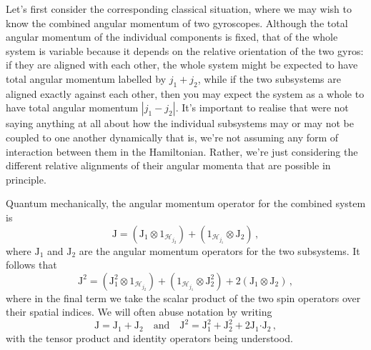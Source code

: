 \documentclass{article}
\theoremstyle{plain}\theoremheaderfont{\normalfont\itshape}\theorembodyfont{\rmfamily}\theoremseparator{.}\newtheorem*{rem}{Remark}\newtheorem*{ex}{Example}\newtheorem*{proof}{Proof}\newtheorem*{altp}{Alternative proof}
\theoremstyle{plain}\theoremheaderfont{\normalfont\bfseries}\theorembodyfont{\rmfamily}\theoremseparator{.}\newtheorem{thm}{Theorem}[section]\newtheorem{lem}[thm]{Lemma}\newtheorem{prop}[thm]{Proposition}\newtheorem*{cor}{Corollary}\newtheorem{defn}[thm]{Definition}\newtheorem{clm}[thm]{Claim}\newtheorem{clminproof}{Claim}
\theoremstyle{break}\theoremheaderfont{\normalfont\itshape}\theorembodyfont{\rmfamily}\theoremseparator{.\medskip}\newtheorem*{proofskip}{Proof}\newtheorem*{exs}{Examples}\newtheorem*{rems}{Remarks}
\theoremstyle{break}\theoremheaderfont{\normalfont\bfseries}\theorembodyfont{\rmfamily}\theoremseparator{.\medskip}\newtheorem{lemskip}[thm]{Lemma}\newtheorem{defnskip}[thm]{Definition}\newtheorem{propskip}[thm]{Proposition}\newtheorem{thmskip}[thm]{Theorem}
\numberwithin{equation}{section}
\newcommand{\vb}[1]{\bm{\mathrm{#1}}}
\newcommand{\vdot}{\bm{\cdot}}
\newcommand{\abs}[1]{\left| #1 \right|}
\newcommand{\hb}{\mathcal{H}}
\begin{document}
    Let's first consider the corresponding classical situation, where we may wish to know the combined angular momentum of two gyroscopes. Although the total angular momentum of the individual components is fixed, that of the whole system is variable because it depends on the relative orientation of the two gyros: if they are aligned with each other, the whole system might be expected to have total angular momentum labelled by \(j_1+j_2\), while if the two subsystems are aligned exactly against each other, then you may expect the system as a whole to have total angular momentum \(\abs{j_1-j_2}\). It's important to realise that were not saying anything at all about how the individual subsystems may or may not be coupled to one another dynamically that is, we're not assuming any form of interaction between them in the Hamiltonian. Rather, we're just considering the different relative alignments of their angular momenta that are possible in principle.

    Quantum mechanically, the angular momentum operator for the combined system is
    \begin{equation}
        \vb{J}=(\vb{J}_1\otimes 1_{\hb_{j_2}})+(1_{\hb_{j_1}}\otimes\vb{J}_2)\,,
    \end{equation}
    where \(\vb{J}_1\) and \(\vb{J}_2\) are the angular momentum operators for the two subsystems. It follows that
    \begin{equation}\label{total_angular_momentum_op}
        \vb{J}^2=(\vb{J}_1^2\otimes 1_{\hb_{j_2}})+(1_{\hb_{j_1}}\otimes \vb{J}_2^2)+2(\vb{J}_1\otimes\vb{J}_2)\,,
    \end{equation}
    where in the final term we take the scalar product of the two spin operators over their spatial indices. We will often abuse notation by writing
    \begin{equation}
        \vb{J}=\vb{J}_1+\vb{J}_2\quad\text{and}\quad\vb{J}^2=\vb{J}_1^2+\vb{J}_2^2+2\vb{J}_1\vdot\vb{J}_2\,,
    \end{equation}
    with the tensor product and identity operators being understood.
    
\end{document}
